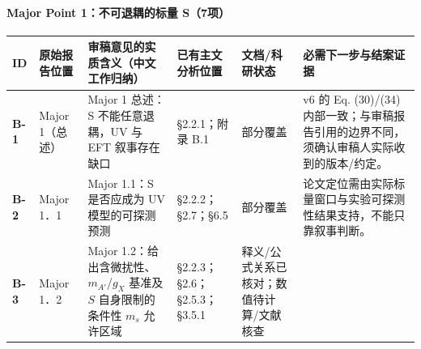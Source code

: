 \documentclass[
  chinese,
  UTF8]{ctexart}
\newcounter{none} %
\begin{document}
\paragraph{Major Point 1：不可退耦的标量
S（7项）}\label{major-point-1ux4e0dux53efux9000ux8026ux7684ux6807ux91cf-s7ux9879}

{\def\LTcaptype{none} %
\begin{longtable}[]{@{}
  >{\raggedright\arraybackslash}p{}
  >{\raggedright\arraybackslash}p{}
  >{\raggedright\arraybackslash}p{}
  >{\raggedright\arraybackslash}p{}
  >{\raggedright\arraybackslash}p{}
  >{\raggedright\arraybackslash}p{}@{}}
\toprule\noalign{}
\begin{minipage}[b]{\linewidth}\raggedright
ID
\end{minipage} & \begin{minipage}[b]{\linewidth}\raggedright
原始报告位置
\end{minipage} & \begin{minipage}[b]{\linewidth}\raggedright
审稿意见的实质含义（中文工作归纳）
\end{minipage} & \begin{minipage}[b]{\linewidth}\raggedright
已有主文分析位置
\end{minipage} & \begin{minipage}[b]{\linewidth}\raggedright
文档/科研状态
\end{minipage} & \begin{minipage}[b]{\linewidth}\raggedright
必需下一步与结案证据
\end{minipage} \\
\midrule\noalign{}
\endhead
\bottomrule\noalign{}
\endlastfoot
\textbf{B-1} & Major 1（总述） & Major 1 总述：S 不能任意退耦，UV 与 EFT
叙事存在缺口 & §2.2.1；附录 B.1 & 部分覆盖 & v6 的 Eq. (30)/(34)
内部一致；与审稿报告引用的边界不同，须确认审稿人实际收到的版本/约定。 \\
\textbf{B-2} & Major 1．1 & Major 1.1：S 是否应成为 UV 模型的可探测预测
& §2.2.2；§2.7；§6.5 & 部分覆盖 &
论文定位需由实际标量窗口与实验可探测性结果支持，不能只靠叙事判断。 \\
\textbf{B-3} & Major 1．2 & Major 1.2：给出含微扰性、\(m_{A'}\)/\(g_X\)
基准及 \(S\) 自身限制的条件性 \(m_s\) 允许区域 &
§2.2.3；§2.6；§2.5.3；§3.5.1 & 释义/公式关系已核对；数值待计算/文献核查

\end{longtable}}
\end{document}
